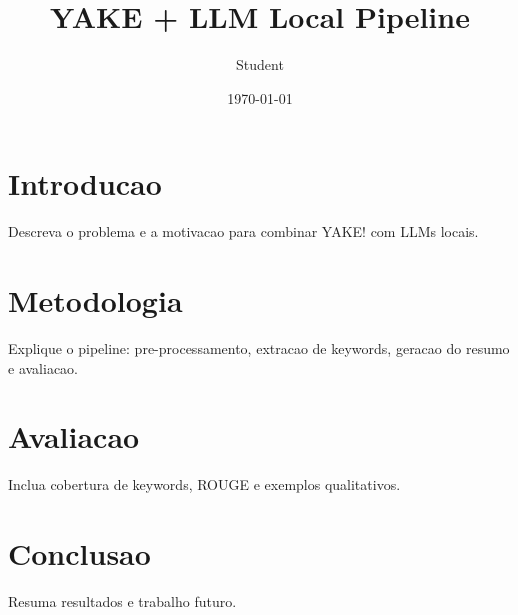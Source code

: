 \documentclass{article}
\title{YAKE + LLM Local Pipeline}
\author{Student}
\date{\today}
\begin{document}
\maketitle

\section{Introducao}
Descreva o problema e a motivacao para combinar YAKE! com LLMs locais.

\section{Metodologia}
Explique o pipeline: pre-processamento, extracao de keywords, geracao do resumo e avaliacao.

\section{Avaliacao}
Inclua cobertura de keywords, ROUGE e exemplos qualitativos.

\section{Conclusao}
Resuma resultados e trabalho futuro.
\end{document}
